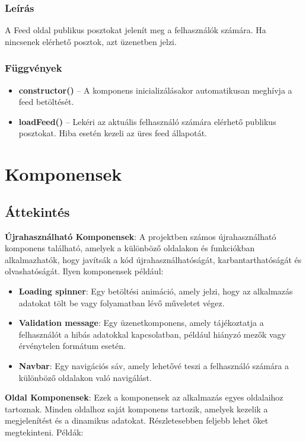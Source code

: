 \documentclass[12pt]{report}
\begin{document}
\subsubsection{Leírás}
A Feed oldal publikus posztokat jelenít meg a felhasználók számára. Ha nincsenek elérhető posztok, azt üzenetben jelzi.

\subsubsection{Függvények}

\begin{itemize}
  \item \textbf{constructor()} -- A komponens inicializálásakor automatikusan meghívja a feed betöltését.
  \item \textbf{loadFeed()} -- Lekéri az aktuális felhasználó számára elérhető publikus posztokat. Hiba esetén kezeli az üres feed állapotát.
\end{itemize}


\section{Komponensek}

\subsection{Áttekintés}

\textbf{Újrahasználható Komponensek}: A projektben számos újrahasználható komponens található, amelyek a különböző oldalakon és funkciókban alkalmazhatók, hogy javítsák a kód újrahasználhatóságát, karbantarthatóságát és olvashatóságát. Ilyen komponensek például:

\begin{itemize}
  \item \textbf{Loading spinner}: Egy betöltési animáció, amely jelzi, hogy az alkalmazás adatokat tölt be vagy folyamatban lévő műveletet végez.
  \item \textbf{Validation message}: Egy üzenetkomponens, amely tájékoztatja a felhasználót a hibás adatokkal kapcsolatban, például hiányzó mezők vagy érvénytelen formátum esetén.
  \item \textbf{Navbar}: Egy navigációs sáv, amely lehetővé teszi a felhasználó számára a különböző oldalakon való navigálást.
\end{itemize}

\textbf{Oldal Komponensek}: Ezek a komponensek az alkalmazás egyes oldalaihoz tartoznak. Minden oldalhoz saját komponens tartozik, amelyek kezelik a megjelenítést és a dinamikus adatokat. Részletesebben feljebb lehet őket megtekinteni. Példák:
\end{document}
